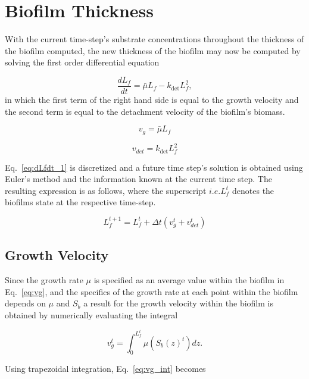 \documentclass[letterpaper, twoside]{article}
\numberwithin{equation}{section}
\newcommand{\ie}{i.e.}
\begin{document}
\section{Biofilm Thickness}
With the current time-step's substrate concentrations throughout the thickness of the biofilm computed, the new thickness of the biofilm may now be computed by solving the first order differential equation

\begin{equation}
  \label{eq:dLfdt_1}
  \frac{d L_f}{dt} = {\bar\mu L_f}-{k_{\mathrm{det}}L_f^2},
\end{equation}
in which the first term of the right hand side is equal to the growth velocity and the second term is equal to the detachment velocity of the biofilm's biomass. 

\begin{equation}
  \label{eq:vg}
  v_g={\bar\mu L_f}
\end{equation}

\begin{equation}
  \label{eq:vdet}
  v_{det}={k_{\mathrm{det}}L_f^2}
\end{equation}

Eq.~\ref{eq:dLfdt_1} is discretized and a future time step's solution is obtained using Euler's method and the information known at the current time step. The resulting expression is as follows, where the superscript $\ie L_f^{t}$ denotes the biofilms state at the respective time-step.

\begin{equation}
  \label{eq:dLfdt_2}
  {L_f^{t+1}}={L_f^{t}} + {\Delta t}({v_g^{t}+v_{det}^{t}})
\end{equation}

\subsection{Growth Velocity}
Since the growth rate $\mu$ is specified as an average value within the biofilm in Eq.~\ref{eq:vg}, and the specifics of the growth rate at each point within the biofilm depends on $\mu$ and $S_b$ a result for the growth velocity within the biofilm is obtained by numerically evaluating the integral 

\begin{equation}
  \label{eq:vg_int}
  {v_g^{t}}={\int_{0}^{L_f^{t}}\mu(S_b(z)^{t})dz}.
\end{equation}

Using trapezoidal integration, Eq.~\ref{eq:vg_int} becomes
\end{document}
